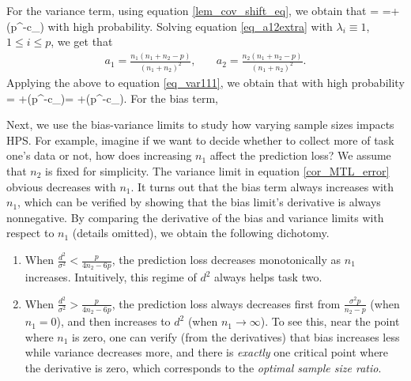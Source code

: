 {\cor
For the variance term, using equation \eqref{lem_cov_shift_eq}, we obtain that
\be\label{eq_var111} = \tr{}=+\OO(p^{-c_\varphi})\ee
with high probability. Solving equation \eqref{eq_a12extra} with $\lambda_i\equiv 1$, $1\le i\le p$, we get that
	\begin{align}
		 a_1 = \frac{n_1(n_1 + n_2 - p)}{(n_1 + n_2)^2} ,\quad
		& a_2 = \frac{n_2(n_1 + n_2 - p)}{(n_1 +n_2)^2} . \label{simplesovlea12}
			\end{align}
Applying the above to equation \eqref{eq_var111}, we obtain that with high probability
\be\label{eq_var112}  =  \cdot {}+\OO(p^{-c_\varphi})=  +\OO(p^{-c_\varphi}).\ee
For the bias term,
}


Next, we use the bias-variance limits to study how varying sample sizes impacts HPS.
For example, imagine if we want to decide whether to collect more of task one's data or not, how does increasing $n_1$ affect the prediction loss?
We assume that $n_2$ is fixed for simplicity.
The variance limit in equation \eqref{cor_MTL_error} obvious decreases with $n_1$.
It turns out that the bias term always increases with $n_1$, which can be verified by showing that the bias limit's derivative is always nonnegative.
By comparing the derivative of the bias and variance limits with respect to $n_1$ (details omitted), we obtain the following dichotomy.
\begin{enumerate}
	\item When $\frac{d^2}{\sigma^2} < \frac{p}{4n_2 - 6p}$, the prediction loss decreases monotonically as $n_1$ increases.
	Intuitively, this regime of $d^2$ always helps task two.
	\item When $\frac{d^2}{\sigma^2} > \frac{p}{4n_2 - 6p}$, the prediction loss always decreases first from $\frac{\sigma^2 p}{n_2 - p}$ (when $n_1 = 0$), and then increases to $d^2$ (when $n_1 \rightarrow \infty$).
	To see this, near the point where $n_1$ is zero, one can verify (from the derivatives) that bias increases less while variance decreases more, and there is \textit{exactly} one critical point where the derivative is zero, which corresponds to the \textit{optimal sample size ratio}.
\end{enumerate}
\fi

